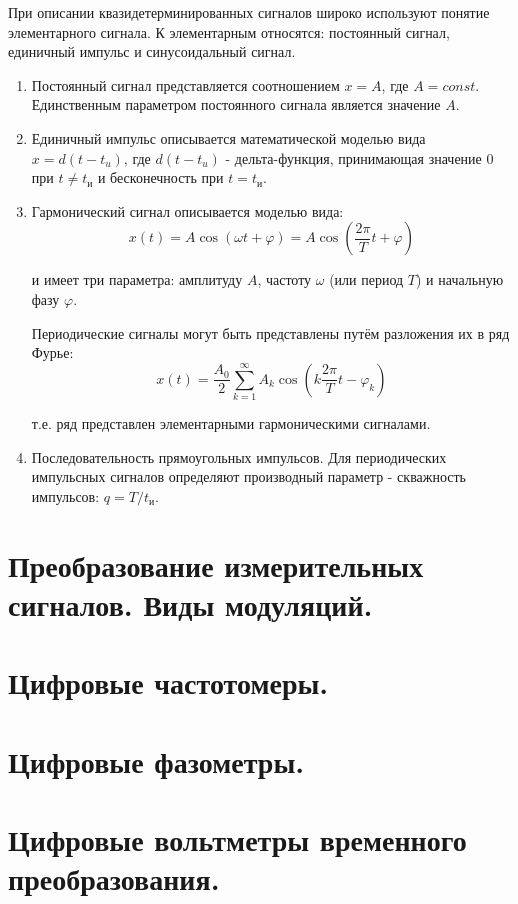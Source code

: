 \documentclass[unicode, 12pt, a4paper, oneside]{article}
\begin{document}
При описании квазидетерминированных сигналов широко используют понятие элементарного сигнала. 
К элементарным относятся: постоянный сигнал, единичный импульс и синусоидальный сигнал.
\begin{enumerate}
\item Постоянный сигнал представляется соотношением $x = A$, где $A = const$. Единственным параметром постоянного сигнала является значение $A$.
\item Единичный импульс описывается математической моделью вида $x=d(t-t_u)$,
где $d(t-t_u)$ - дельта-функция, принимающая значение 0 при $t \neq t_\text{и}$ и бесконечность при $t=t_\text{и}$.
\item Гармонический сигнал описывается моделью вида: 
\begin{displaymath}
x(t)= A\cos (\omega t+\varphi)=A\cos (\frac{2\pi}{T} t+\varphi)
\end{displaymath}

и имеет три параметра: амплитуду $A$, частоту $\omega$ (или период $T$) и начальную фазу $\varphi$.

Периодические сигналы могут быть представлены путём разложения их в ряд Фурье:
\begin{displaymath}
x(t)= \frac{A_0}{2} \sum_{k=1}^{\infty} A_k\cos (k \frac{2\pi}{T} t-\varphi_k)
\end{displaymath}

т.е. ряд представлен элементарными гармоническими сигналами.
\item Последовательность прямоугольных импульсов. Для периодических импульсных сигналов определяют производный параметр - скважность импульсов: $q=T/t_\text{и}$.
\end{enumerate}
 
\section{Преобразование измерительных сигналов. Виды модуляций.}
\section{Цифровые частотомеры.}
\section{Цифровые фазометры.}
\section{Цифровые вольтметры временного преобразования.}
\end{document}
